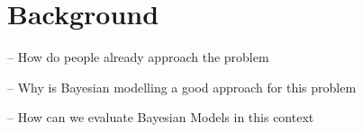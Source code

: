 \section{Background}

-- How do people already approach the problem 

-- Why is Bayesian modelling a good approach for this problem 

-- How can we evaluate Bayesian Models in this context

